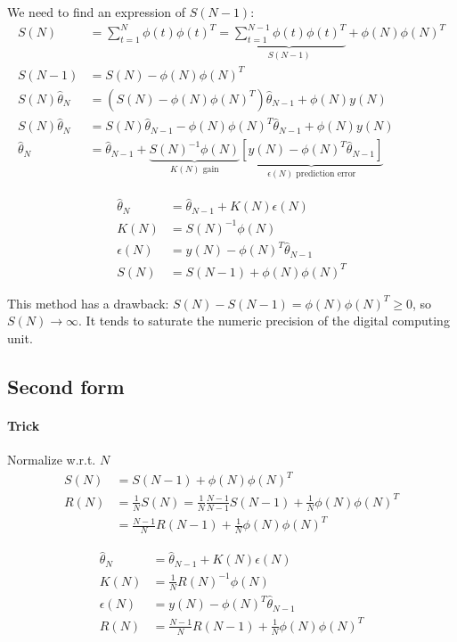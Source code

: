 We need to find an expression of $S(N-1)$:
\begin{align*}
    S(N) &= \sum_{t=1}^N \phi(t)\phi(t)^T = \underbrace{\sum_{t=1}^{N-1} \phi(t)\phi(t)^T}_{S(N-1)} + \phi(N)\phi(N)^T \\
    S(N-1) &= S(N) - \phi(N)\phi(N)^T \\
    S(N)\hat{\theta}_N &= \left( S(N) - \phi(N)\phi(N)^T \right)\hat{\theta}_{N-1} + \phi(N)y(N) \\
    S(N)\hat{\theta}_N &= S(N)\hat{\theta}_{N-1} - \phi(N)\phi(N)^T\hat{\theta}_{N-1} + \phi(N)y(N) \\
    \hat{\theta}_N &= \hat{\theta}_{N-1} + \underbrace{S(N)^{-1}\phi(N)}_{K(N)\text{ gain}}\underbrace{\left[ y(N) - \phi(N)^T\hat{\theta}_{N-1} \right]}_{\epsilon(N) \text{ prediction error}}
\end{align*}

\begin{align*}
    \hat{\theta}_N &= \hat{\theta}_{N-1} + K(N)\epsilon(N) \\
    K(N) &= S(N)^{-1}\phi(N) \\
    \epsilon(N) &= y(N) - \phi(N)^T\hat{\theta}_{N-1} \\
    S(N) &= S(N-1) + \phi(N)\phi(N)^T
\end{align*}

This method has a drawback: $S(N) - S(N-1) = \phi(N)\phi(N)^T \ge 0$, so $S(N) \rightarrow \infty$.
It tends to saturate the numeric precision of the digital computing unit.

\subsection{Second form}

\paragraph{Trick} Normalize w.r.t. $N$
\begin{align*}
    S(N) &= S(N-1) + \phi(N)\phi(N)^T \\
    R(N) &= \frac{1}{N} S(N) = \frac{1}{N} \frac{N-1}{N-1} S(N-1) + \frac{1}{N} \phi(N)\phi(N)^T \\
    &= \frac{N-1}{N}R(N-1) + \frac{1}{N}\phi(N)\phi(N)^T
\end{align*}

\begin{align*}
    \hat{\theta}_N &= \hat{\theta}_{N-1} + K(N)\epsilon(N) \\
    K(N) &= \frac{1}{N}R(N)^{-1}\phi(N) \\
    \epsilon(N) &= y(N) - \phi(N)^T\hat{\theta}_{N-1} \\
    R(N) &= \frac{N-1}{N}R(N-1) + \frac{1}{N}\phi(N)\phi(N)^T
\end{align*}


